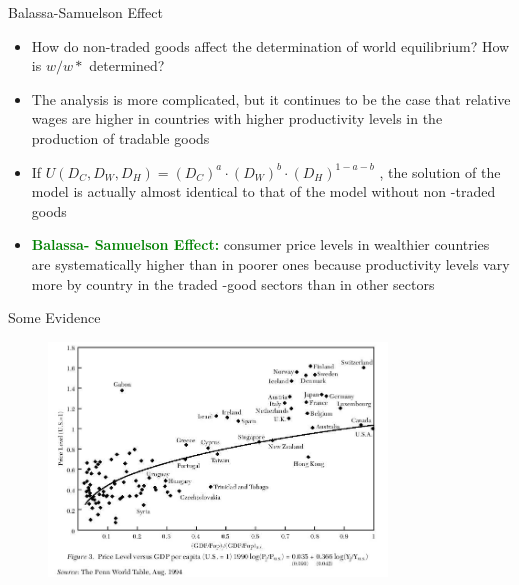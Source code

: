 \documentclass[10pt,hyperref={CJKbookmarks=true},xcolor=dvipsnames,aspectratio=169]{beamer}
\begin{document}
\begin{frame}{Balassa-Samuelson Effect}

\begin{itemize}
\item How do non-traded goods affect the determination of world equilibrium?
How is $w/w*$ determined? 
\item The analysis is more complicated, but it continues to be the case
that relative wages are higher in countries with higher productivity
levels in the production of tradable goods 
\item If $U(D_{C},D_{W},D_{H})=(D_{C})^{a}\cdot(D_{W})^{b}\cdot(D_{H})^{1-a-b}$
, the solution of the model is actually almost identical to that of
the model without non -traded goods 
\item \textbf{\textcolor{green}{Balassa- Samuelson Effect:}} consumer price
levels in wealthier countries are systematically higher than in poorer
ones because productivity levels vary more by country in the traded
-good sectors than in other sectors 
\end{itemize}
\end{frame}

\begin{frame}{Some Evidence }


\begin{figure}
\begin{centering}
\includegraphics[width=9cm]{fig/ricardo/lec3-16}
\par\end{centering}

\end{figure}

\end{frame}
\end{document}
